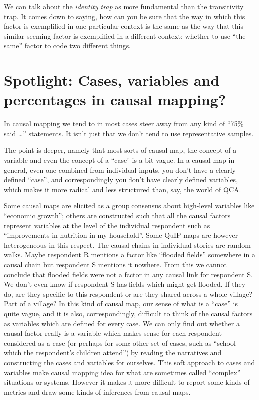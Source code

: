 \documentclass[
]{book}
\begin{document}
We can talk about the \emph{identity trap} as more fundamental than the transitivity trap. It comes down to saying, how can you be sure that the way in which this factor is exemplified in one particular context is the same as the way that this similar seeming factor is exemplified in a different context: whether to use ``the same'' factor to code two different things.

\hypertarget{spotlight-cases-variables-and-percentages-in-causal-mapping}{%
\chapter{Spotlight: Cases, variables and percentages in causal mapping?}\label{spotlight-cases-variables-and-percentages-in-causal-mapping}}

In causal mapping we tend to in most cases steer away from any kind of ``75\% said \ldots{}'' statements. It isn't just that we don't tend to use representative samples.

The point is deeper, namely that most sorts of causal map, the concept of a variable and even the concept of a ``case'' is a bit vague. In a causal map in general, even one combined from individual inputs, you don't have a clearly defined ``case'', and correspondingly you don't have clearly defined variables, which makes it more radical and less structured than, say, the world of QCA.

Some causal maps are elicited as a group consensus about high-level variables like ``economic growth''; others are constructed such that all the causal factors represent variables at the level of the individual respondent such as ``improvements in nutrition in my household''. Some QuIP maps are however heterogeneous in this respect. The causal chains in individual stories are random walks. Maybe respondent R mentions a factor like ``flooded fields'' somewhere in a causal chain but respondent S mentions it nowhere. From this we cannot conclude that flooded fields were not a factor in any causal link for respondent S. We don't even know if respondent S has fields which might get flooded. If they do, are they specific to this respondent or are they shared across a whole village? Part of a village? In this kind of causal map, our sense of what is a ``case'' is quite vague, and it is also, correspondingly, difficult to think of the causal factors as variables which are defined for every case. We can only find out whether a causal factor really is a variable which makes sense for each respondent considered as a case (or perhaps for some other set of cases, such as ``school which the respondent's children attend'') by reading the narratives and constructing the cases and variables for ourselves.
This soft approach to cases and variables make causal mapping idea for what are sometimes called ``complex'' situations or systems. However it makes it more difficult to report some kinds of metrics and draw some kinds of inferences from causal maps.
\end{document}
